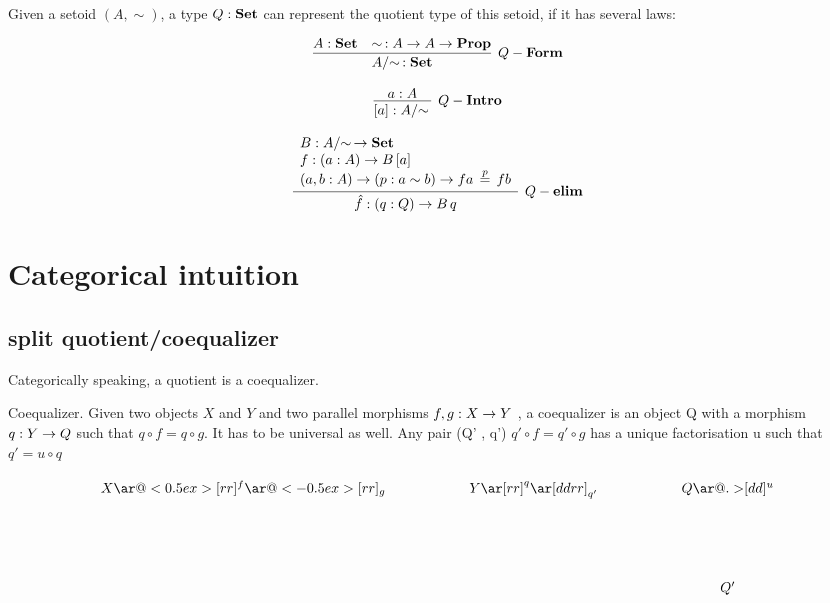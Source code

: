 Given a setoid $(A,\sim)$, a type $Q : \operatorname{\mathbf{Set}}$ can represent the quotient
type of this setoid, if it has several laws:



\begin{equation*}
\infer[Q-\bf{Form}]{\qset{A} : \Set}{A : \Set & \sim\, : A \rightarrow A \rightarrow \bf{Prop}}
\end{equation*}

\begin{equation*}
\infer[Q-\bf{Intro}]{[ a ] : \qset{A}}{a : A}
\end{equation*}

\begin{equation*}
\infer[Q-\bf{elim}]{\hat{f} : (q : Q) \rightarrow B \, q}{
\begin{array}{l}
B : \qset{A} \rightarrow  \bf{Set}\\
f : (a : A) \rightarrow B\, [ a ]\\
(a, b : A)  \rightarrow (p : a \sim b)  \rightarrow f a  \, \stackrel{p}{=} \, f b\\
\end{array}}
\end{equation*}
 

\section{Categorical intuition}


\subsection{split quotient/coequalizer}

Categorically speaking, a quotient is a coequalizer.

\begin{definition}
Coequalizer.
Given two objects $X$ and $Y$ and two parallel morphisms $f, g : X \rightarrow Y$ , a coequalizer is an object Q with a morphism $q : Y \rightarrow Q$ such that $q \circ f = q \circ g$. It has to be universal as well. Any pair (Q' , q') $q' \circ f = q' \circ g$ has a unique factorisation u such that $q' = u \circ q$
\end{definition}

\begin{displaymath}
    \xymatrix{X \ar@<0.5ex>[rr]^f \ar@<-0.5ex>[rr]_g && Y \ar[rr]^q
      \ar[ddrr]_{q'} && Q
      \ar@{.>}[dd]^u \\ \\
& &&& Q' }
\end{displaymath}


